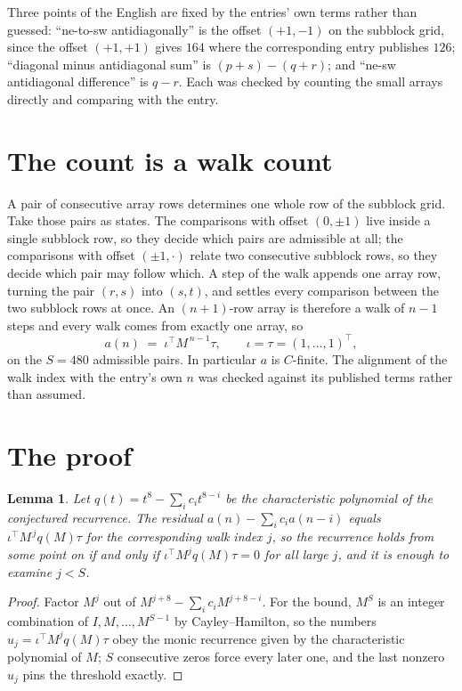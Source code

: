 \documentclass[11pt,a4paper]{article}
\theoremstyle{plain}
\newtheorem{lemma}[theorem]{Lemma}
\theoremstyle{definition}
\begin{document}
Three points of the English are fixed by the entries' own terms rather than guessed:
``ne-to-sw antidiagonally'' is the offset $(+1,-1)$ on the subblock grid, since the offset
$(+1,+1)$ gives $164$ where the corresponding entry publishes $126$; ``diagonal minus
antidiagonal sum'' is $(p+s)-(q+r)$; and ``ne-sw antidiagonal difference'' is $q-r$. Each was
checked by counting the small arrays directly and comparing with the entry.

\section{The count is a walk count}

A pair of consecutive array rows determines one whole row of the subblock grid. Take those
pairs as states. The comparisons with offset $(0,\pm1)$ live inside a single subblock row, so
they decide which pairs are admissible at all; the comparisons with offset $(\pm1,\cdot)$
relate two consecutive subblock rows, so they decide which pair may follow which. A step of the
walk appends one array row, turning the pair $(r,s)$ into $(s,t)$, and settles every comparison
between the two subblock rows at once. An $(n+1)$-row array is therefore a walk of $n-1$ steps
and every walk comes from exactly one array, so
\[
a(n)\;=\;\iota^{\!\top}M^{\,n-1}\tau,\qquad \iota=\tau=(1,\dots,1)^{\!\top},
\]
on the $S=480$ admissible pairs. In particular $a$ is $C$-finite. The alignment of the walk
index with the entry's own $n$ was checked against its published terms rather than assumed.

\section{The proof}

\begin{lemma}\label{lem:crit}
Let $q(t)=t^{8}-\sum_i c_it^{8-i}$ be the characteristic polynomial of the
conjectured recurrence. The residual $a(n)-\sum_ic_ia(n-i)$ equals
$\iota^{\!\top}M^{\,j}q(M)\tau$ for the corresponding walk index $j$, so the recurrence
holds from some point on if and only if $\iota^{\!\top}M^{j}q(M)\tau=0$ for all large $j$,
and it is enough to examine $j<S$.
\end{lemma}

\begin{proof}
Factor $M^{j}$ out of $M^{j+8}-\sum_ic_iM^{j+8-i}$. For the bound, $M^{S}$
is an integer combination of $I,M,\dots,M^{S-1}$ by Cayley--Hamilton, so the numbers
$u_j=\iota^{\!\top}M^{j}q(M)\tau$ obey the monic recurrence given by the characteristic
polynomial of $M$; $S$ consecutive zeros force every later one, and the last nonzero $u_j$
pins the threshold exactly.
\end{proof}
\end{document}
